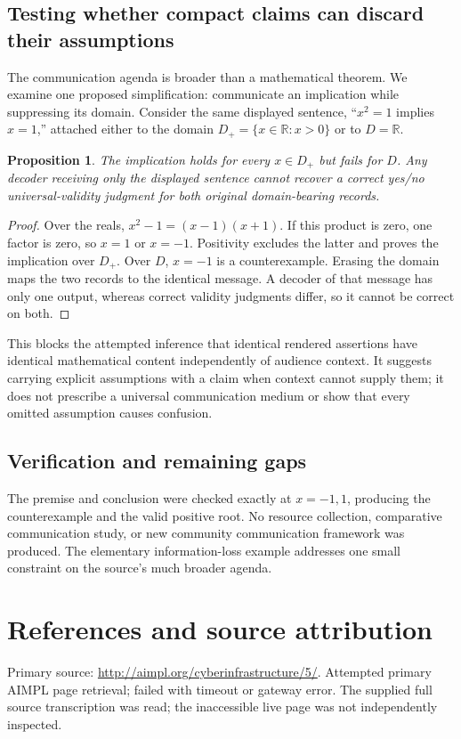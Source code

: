 \documentclass[11pt]{article}
\newtheorem{proposition}{Proposition}
\begin{document}
\subsection{Testing whether compact claims can discard their assumptions}
The communication agenda is broader than a mathematical theorem. We examine one proposed simplification: communicate an implication while suppressing its domain. Consider the same displayed sentence, ``$x^2=1$ implies $x=1$,'' attached either to the domain $D_+=\{x\in\mathbb R:x>0\}$ or to $D=\mathbb R$.
\begin{proposition}
The implication holds for every $x\in D_+$ but fails for $D$. Any decoder receiving only the displayed sentence cannot recover a correct yes/no universal-validity judgment for both original domain-bearing records.
\end{proposition}
\begin{proof}
Over the reals, $x^2-1=(x-1)(x+1)$. If this product is zero, one factor is zero, so $x=1$ or $x=-1$. Positivity excludes the latter and proves the implication over $D_+$. Over $D$, $x=-1$ is a counterexample. Erasing the domain maps the two records to the identical message. A decoder of that message has only one output, whereas correct validity judgments differ, so it cannot be correct on both.
\end{proof}
This blocks the attempted inference that identical rendered assertions have identical mathematical content independently of audience context. It suggests carrying explicit assumptions with a claim when context cannot supply them; it does not prescribe a universal communication medium or show that every omitted assumption causes confusion.
\subsection{Verification and remaining gaps}
The premise and conclusion were checked exactly at $x=-1,1$, producing the counterexample and the valid positive root. No resource collection, comparative communication study, or new community communication framework was produced. The elementary information-loss example addresses one small constraint on the source's much broader agenda.

\section{References and source attribution}
Primary source: \url{http://aimpl.org/cyberinfrastructure/5/}. Attempted primary AIMPL page retrieval; failed with timeout or gateway error. The supplied full source transcription was read; the inaccessible live page was not independently inspected.
\end{document}
